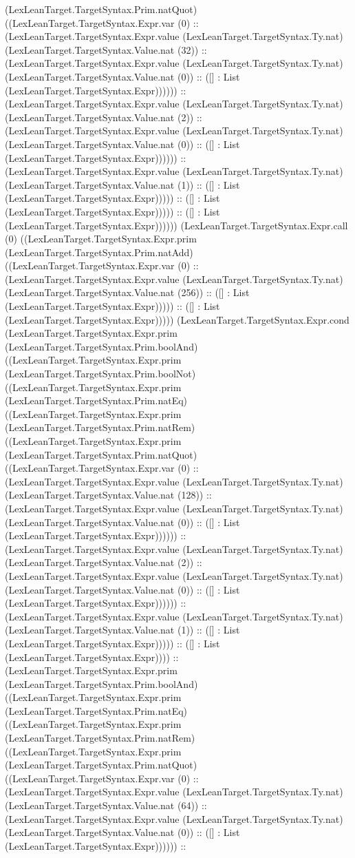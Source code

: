 \documentclass[11pt]{article}
\begin{document}
(LexLeanTarget.TargetSyntax.Prim.natQuot) ((LexLeanTarget.TargetSyntax.Expr.var (0) :: (LexLeanTarget.TargetSyntax.Expr.value (LexLeanTarget.TargetSyntax.Ty.nat) (LexLeanTarget.TargetSyntax.Value.nat (32)) :: (LexLeanTarget.TargetSyntax.Expr.value (LexLeanTarget.TargetSyntax.Ty.nat) (LexLeanTarget.TargetSyntax.Value.nat (0)) :: ([] : List (LexLeanTarget.TargetSyntax.Expr)))))) :: (LexLeanTarget.TargetSyntax.Expr.value (LexLeanTarget.TargetSyntax.Ty.nat) (LexLeanTarget.TargetSyntax.Value.nat (2)) :: (LexLeanTarget.TargetSyntax.Expr.value (LexLeanTarget.TargetSyntax.Ty.nat) (LexLeanTarget.TargetSyntax.Value.nat (0)) :: ([] : List (LexLeanTarget.TargetSyntax.Expr)))))) :: (LexLeanTarget.TargetSyntax.Expr.value (LexLeanTarget.TargetSyntax.Ty.nat) (LexLeanTarget.TargetSyntax.Value.nat (1)) :: ([] : List (LexLeanTarget.TargetSyntax.Expr))))) :: ([] : List (LexLeanTarget.TargetSyntax.Expr))))) :: ([] : List (LexLeanTarget.TargetSyntax.Expr)))))) (LexLeanTarget.TargetSyntax.Expr.call (0) ((LexLeanTarget.TargetSyntax.Expr.prim (LexLeanTarget.TargetSyntax.Prim.natAdd) ((LexLeanTarget.TargetSyntax.Expr.var (0) :: (LexLeanTarget.TargetSyntax.Expr.value (LexLeanTarget.TargetSyntax.Ty.nat) (LexLeanTarget.TargetSyntax.Value.nat (256)) :: ([] : List (LexLeanTarget.TargetSyntax.Expr))))) :: ([] : List (LexLeanTarget.TargetSyntax.Expr))))) (LexLeanTarget.TargetSyntax.Expr.cond (LexLeanTarget.TargetSyntax.Expr.prim (LexLeanTarget.TargetSyntax.Prim.boolAnd) ((LexLeanTarget.TargetSyntax.Expr.prim (LexLeanTarget.TargetSyntax.Prim.boolNot) ((LexLeanTarget.TargetSyntax.Expr.prim (LexLeanTarget.TargetSyntax.Prim.natEq) ((LexLeanTarget.TargetSyntax.Expr.prim (LexLeanTarget.TargetSyntax.Prim.natRem) ((LexLeanTarget.TargetSyntax.Expr.prim (LexLeanTarget.TargetSyntax.Prim.natQuot) ((LexLeanTarget.TargetSyntax.Expr.var (0) :: (LexLeanTarget.TargetSyntax.Expr.value (LexLeanTarget.TargetSyntax.Ty.nat) (LexLeanTarget.TargetSyntax.Value.nat (128)) :: (LexLeanTarget.TargetSyntax.Expr.value (LexLeanTarget.TargetSyntax.Ty.nat) (LexLeanTarget.TargetSyntax.Value.nat (0)) :: ([] : List (LexLeanTarget.TargetSyntax.Expr)))))) :: (LexLeanTarget.TargetSyntax.Expr.value (LexLeanTarget.TargetSyntax.Ty.nat) (LexLeanTarget.TargetSyntax.Value.nat (2)) :: (LexLeanTarget.TargetSyntax.Expr.value (LexLeanTarget.TargetSyntax.Ty.nat) (LexLeanTarget.TargetSyntax.Value.nat (0)) :: ([] : List (LexLeanTarget.TargetSyntax.Expr)))))) :: (LexLeanTarget.TargetSyntax.Expr.value (LexLeanTarget.TargetSyntax.Ty.nat) (LexLeanTarget.TargetSyntax.Value.nat (1)) :: ([] : List (LexLeanTarget.TargetSyntax.Expr))))) :: ([] : List (LexLeanTarget.TargetSyntax.Expr)))) :: (LexLeanTarget.TargetSyntax.Expr.prim (LexLeanTarget.TargetSyntax.Prim.boolAnd) ((LexLeanTarget.TargetSyntax.Expr.prim (LexLeanTarget.TargetSyntax.Prim.natEq) ((LexLeanTarget.TargetSyntax.Expr.prim (LexLeanTarget.TargetSyntax.Prim.natRem) ((LexLeanTarget.TargetSyntax.Expr.prim (LexLeanTarget.TargetSyntax.Prim.natQuot) ((LexLeanTarget.TargetSyntax.Expr.var (0) :: (LexLeanTarget.TargetSyntax.Expr.value (LexLeanTarget.TargetSyntax.Ty.nat) (LexLeanTarget.TargetSyntax.Value.nat (64)) :: (LexLeanTarget.TargetSyntax.Expr.value (LexLeanTarget.TargetSyntax.Ty.nat) (LexLeanTarget.TargetSyntax.Value.nat (0)) :: ([] : List (LexLeanTarget.TargetSyntax.Expr)))))) :: 
\end{document}
